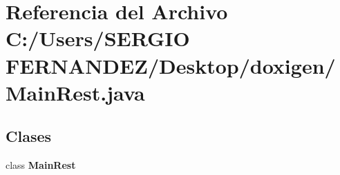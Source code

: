 \section{Referencia del Archivo C:/Users/SERGIO FERNANDEZ/Desktop/doxigen/MainRest.java}
\label{_main_rest_8java}
\subsection*{Clases}
\begin{CompactItemize}
\item 
class {\bf MainRest}
\end{CompactItemize}
